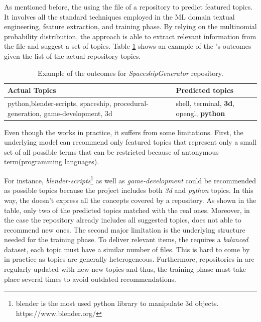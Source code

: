 As mentioned before, the \MNB using the \RM file of a repository to predict featured topics. It involves all the standard techniques employed in the ML domain \ie textual engineering, feature extraction, and training phase. By relying on the multinomial probability distribution, the approach is able to extract relevant information from the \RM file and suggest a set of topics. Table \ref{tab:example} shows an example of the \MNB's outcomes given the list of the actual repository topics. 

\begin{table}[h]
\centering
\resizebox{8.5cm}{!} {
\footnotesize
\begin{tabular}{| p{3.2cm} | p{3.2cm} | }
\hline
 \textbf{Actual Topics} &\textbf{ Predicted topics} \\ \hline
     python,blender-scripts, spaceship, procedural-generation, game-development, 3d        &  
  shell, terminal, \textbf{3d},	opengl,	\textbf{python}        \\ \hline

\end{tabular}
}
\caption{Example of the \MNB outcomes for \emph{SpaceshipGenerator} repository.}
\label{tab:example}
\end{table} 



Even though the \MNB works in practice, it suffers from some limitations. First, the underlying model can recommend only featured topics that represent only a small set of all possible terms that can be restricted because of antonymous term(\eg programming languages).

For instance, \emph{blender-scripts}\footnote{blender is the most used python library to manipulate 3d objects. \url{}https://www.blender.org/} as well as \emph{game-development} could be recommended as possible topics because the project includes both \emph{3d} and \emph{python} topics.
In this way, the \MNB doesn't express all the concepts covered by a \GH repository. As shown in the table, only two of the predicted topics matched with the real ones. Moreover, in the case the repository already includes all suggested topics, \MNB does not able to recommend new ones.
The second major limitation is the underlying structure needed for the training phase. To deliver relevant items, the \MNB requires a \emph{balanced} dataset, \ie each topic must have a similar number of  \RM files. This is hard to come by in practice as topics are generally heterogeneous.
Furthermore, repositories in \GH are regularly updated with new new topics and thus, the training phase must take place several times to avoid outdated recommendations. 

